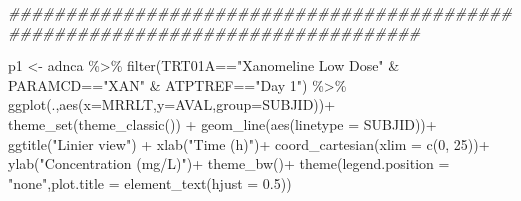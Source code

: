 \documentclass[
  letterpaper,
  DIV=11,
  numbers=noendperiod]{scrreprt}
\newenvironment{Shaded}{\begin{snugshade}}{\end{snugshade}}
\newcommand{\AttributeTok}[1]{\textcolor[rgb]{0.40,0.45,0.13}{#1}}
\newcommand{\DecValTok}[1]{\textcolor[rgb]{0.68,0.00,0.00}{#1}}
\newcommand{\DocumentationTok}[1]{\textcolor[rgb]{0.37,0.37,0.37}{\textit{#1}}}
\newcommand{\FloatTok}[1]{\textcolor[rgb]{0.68,0.00,0.00}{#1}}
\newcommand{\FunctionTok}[1]{\textcolor[rgb]{0.28,0.35,0.67}{#1}}
\newcommand{\NormalTok}[1]{\textcolor[rgb]{0.00,0.23,0.31}{#1}}
\newcommand{\OtherTok}[1]{\textcolor[rgb]{0.00,0.23,0.31}{#1}}
\newcommand{\SpecialCharTok}[1]{\textcolor[rgb]{0.37,0.37,0.37}{#1}}
\newcommand{\StringTok}[1]{\textcolor[rgb]{0.13,0.47,0.30}{#1}}
\begin{document}
\begin{Shaded}
\begin{Highlighting}[]
\DocumentationTok{\#\#\#\#\#\#\#\#\#\#\#\#\#\#\#\#\#\#\#\#\#\#\#\#\#\#\#\#\#\#\#\#\#\#\#\#\#\#\#\#\#\#\#\#\#\#\#\#\#\#\#\#\#\#\#\#\#\#\#\#\#\#\#\#\#\#\#\#\#\#\#\#\#\#\#\#\#\#\#\#}

\NormalTok{p1 }\OtherTok{\textless{}{-}}\NormalTok{ adnca }\SpecialCharTok{\%\textgreater{}\%} 
  \FunctionTok{filter}\NormalTok{(TRT01A}\SpecialCharTok{==}\StringTok{"Xanomeline Low Dose"} \SpecialCharTok{\&} 
\NormalTok{        PARAMCD}\SpecialCharTok{==}\StringTok{"XAN"} \SpecialCharTok{\&}\NormalTok{ ATPTREF}\SpecialCharTok{==}\StringTok{"Day 1"}\NormalTok{) }\SpecialCharTok{\%\textgreater{}\%}
  \FunctionTok{ggplot}\NormalTok{(.,}\FunctionTok{aes}\NormalTok{(}\AttributeTok{x=}\NormalTok{MRRLT,}\AttributeTok{y=}\NormalTok{AVAL,}\AttributeTok{group=}\NormalTok{SUBJID))}\SpecialCharTok{+}
  \FunctionTok{theme\_set}\NormalTok{(}\FunctionTok{theme\_classic}\NormalTok{()) }\SpecialCharTok{+}
  \FunctionTok{geom\_line}\NormalTok{(}\FunctionTok{aes}\NormalTok{(}\AttributeTok{linetype =}\NormalTok{ SUBJID))}\SpecialCharTok{+}
  \FunctionTok{ggtitle}\NormalTok{(}\StringTok{"Linier view"}\NormalTok{) }\SpecialCharTok{+}
  \FunctionTok{xlab}\NormalTok{(}\StringTok{"Time (h)"}\NormalTok{)}\SpecialCharTok{+}
  \FunctionTok{coord\_cartesian}\NormalTok{(}\AttributeTok{xlim =} \FunctionTok{c}\NormalTok{(}\DecValTok{0}\NormalTok{, }\DecValTok{25}\NormalTok{))}\SpecialCharTok{+}
  \FunctionTok{ylab}\NormalTok{(}\StringTok{"Concentration (mg/L)"}\NormalTok{)}\SpecialCharTok{+}
  \FunctionTok{theme\_bw}\NormalTok{()}\SpecialCharTok{+} 
  \FunctionTok{theme}\NormalTok{(}\AttributeTok{legend.position =} \StringTok{"none"}\NormalTok{,}\AttributeTok{plot.title =} \FunctionTok{element\_text}\NormalTok{(}\AttributeTok{hjust =} \FloatTok{0.5}\NormalTok{)) }


\end{Highlighting}
\end{Shaded}
\end{document}
